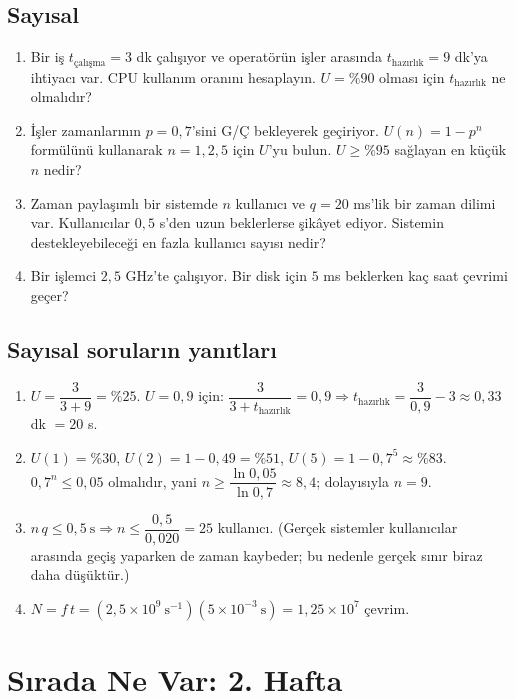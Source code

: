 \documentclass[11pt,a4paper]{article}
\begin{document}
\subsection*{Sayısal}
\begin{enumerate}[leftmargin=1.6em,resume]
  \item Bir iş $t_{\text{çalışma}} = 3$ dk çalışıyor ve operatörün işler arasında $t_{\text{hazırlık}} = 9$ dk'ya ihtiyacı var. CPU kullanım oranını hesaplayın. $U = \%90$ olması için $t_{\text{hazırlık}}$ ne olmalıdır?
  \item İşler zamanlarının $p = 0{,}7$'sini G/Ç bekleyerek geçiriyor. $U(n)=1-p^{n}$ formülünü kullanarak $n = 1, 2, 5$ için $U$'yu bulun. $U \geq \%95$ sağlayan en küçük $n$ nedir?
  \item Zaman paylaşımlı bir sistemde $n$ kullanıcı ve $q = 20$ ms'lik bir zaman dilimi var. Kullanıcılar $0{,}5$ s'den uzun beklerlerse şikâyet ediyor. Sistemin destekleyebileceği en fazla kullanıcı sayısı nedir?
  \item Bir işlemci $2{,}5$ GHz'te çalışıyor. Bir disk için $5$ ms beklerken kaç saat çevrimi geçer?
\end{enumerate}

\subsection*{Sayısal soruların yanıtları}
\begin{enumerate}[leftmargin=1.6em,start=11]
  \item $U = \dfrac{3}{3+9} = \%25$. $U = 0{,}9$ için: $\dfrac{3}{3+t_{\text{hazırlık}}} = 0{,}9 \Rightarrow t_{\text{hazırlık}} = \dfrac{3}{0{,}9} - 3 \approx 0{,}33$ dk $= 20$ s.
  \item $U(1) = \%30$, $U(2) = 1 - 0{,}49 = \%51$, $U(5) = 1 - 0{,}7^{5} \approx \%83$. $0{,}7^{n} \leq 0{,}05$ olmalıdır, yani $n \geq \dfrac{\ln 0{,}05}{\ln 0{,}7} \approx 8{,}4$; dolayısıyla $n = 9$.
  \item $n\,q \leq 0{,}5\ \text{s} \Rightarrow n \leq \dfrac{0{,}5}{0{,}020} = 25$ kullanıcı. (Gerçek sistemler kullanıcılar arasında geçiş yaparken de zaman kaybeder; bu nedenle gerçek sınır biraz daha düşüktür.)
  \item $N = f\,t = (2{,}5\times10^{9}\ \text{s}^{-1})(5\times10^{-3}\ \text{s}) = 1{,}25\times10^{7}$ çevrim.
\end{enumerate}

\section{Sırada Ne Var: 2. Hafta}
\end{document}
